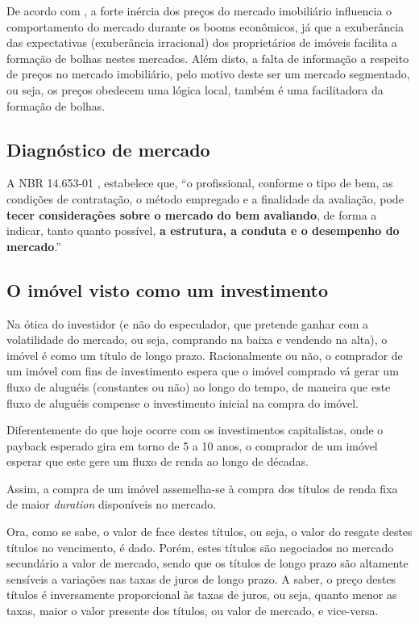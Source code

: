 \documentclass[
	12pt,				%
	oneside,			%
	a4paper,			%
	chapter=TITLE,		%
	section=TITLE,		%
	english,			%
	brazil				%
	]{abntex2}
\begin{document}
De acordo com \textcites{ADAMS201038}[3]{ADAMS201038}, a forte inércia dos preços do
mercado imobiliário influencia o comportamento do mercado durante os booms
econômicos, já que a exuberância das expectativas (exuberância irracional) dos
proprietários de imóveis facilita a formação de bolhas nestes mercados. Além
disto, a falta de informação a respeito de preços no mercado imobiliário, pelo
motivo deste ser um mercado segmentado, ou seja, os preços obedecem uma
lógica local, também é uma facilitadora da formação de bolhas.

\hypertarget{diagnuxf3stico-de-mercado}{%
\subsection{Diagnóstico de mercado}\label{diagnuxf3stico-de-mercado}}

A NBR 14.653-01 \autocite*[12]{NBR1465301}, estabelece que, ``o profissional, conforme o
tipo de bem, as condições de contratação, o método empregado e a finalidade da
avaliação, pode \textbf{tecer considerações sobre o mercado do bem avaliando}, de
forma a indicar, tanto quanto possível, \textbf{a estrutura, a conduta e o desempenho
do mercado}.''

\hypertarget{o-imuxf3vel-visto-como-um-investimento}{%
\subsection{O imóvel visto como um investimento}\label{o-imuxf3vel-visto-como-um-investimento}}

Na ótica do investidor (e não do especulador, que pretende ganhar com a
volatilidade do mercado, ou seja, comprando na baixa e vendendo na alta), o
imóvel é como um título de longo prazo. Racionalmente ou não, o comprador de um
imóvel com fins de investimento espera que o imóvel comprado vá gerar um fluxo
de aluguéis (constantes ou não) ao longo do tempo, de maneira que este fluxo de
aluguéis compense o investimento inicial na compra do imóvel.

Diferentemente do que hoje ocorre com os investimentos capitalistas, onde o
payback esperado gira em torno de 5 a 10 anos, o comprador de um imóvel
esperar que este gere um fluxo de renda ao longo de décadas.

Assim, a compra de um imóvel assemelha-se à compra dos títulos de renda fixa de
maior \emph{duration} disponíveis no mercado.

Ora, como se sabe, o valor de face destes títulos, ou seja, o valor do resgate
destes títulos no vencimento, é dado. Porém, estes títulos são negociados no
mercado secundário a valor de mercado, sendo que os títulos de longo prazo são
altamente sensíveis a variações nas taxas de juros de longo prazo. A saber, o
preço destes títulos é inversamente proporcional às taxas de juros, ou seja,
quanto menor as taxas, maior o valor presente dos títulos, ou valor de mercado,
e vice-versa.
\end{document}
